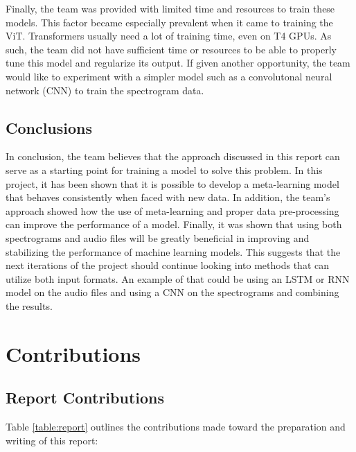\documentclass[12pt, conference]{IEEEtran}
\begin{document}
Finally, the team was provided with limited time and resources to train these models. This factor became especially prevalent when it came to training the ViT. Transformers usually need a lot of training time, even on T4 GPUs. As such, the team did not have sufficient time or resources to be able to properly tune this model and regularize its output. If given another opportunity, the team would like to experiment with a simpler model such as a convolutonal neural network (CNN) to train the spectrogram data.

\subsection{Conclusions}
In conclusion, the team believes that the approach discussed in this report can serve as a starting point for training a model to solve this problem. In this project, it has been shown that it is possible to develop a meta-learning model that behaves consistently when faced with new data. In addition, the team's approach showed how the use of meta-learning and proper data pre-processing can improve the performance of a model. Finally, it was shown that using both spectrograms and audio files will be greatly beneficial in improving and stabilizing the performance of machine learning models. This suggests that the next iterations of the project should continue looking into methods that can utilize both input formats. An example of that could be using an LSTM or RNN model on the audio files and using a CNN on the spectrograms and combining the results.

\section{Contributions}

\subsection{Report Contributions}

Table \ref{table:report} outlines the contributions made toward the preparation and writing of this report:
\end{document}
